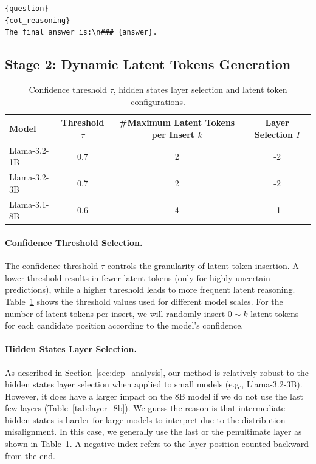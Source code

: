 \documentclass{article}
\theoremstyle{plain}
\theoremstyle{definition}
\theoremstyle{remark}
\begin{document}
\begin{tcolorbox}[colback=gray!5, colframe=gray!50, title=Stage 1 Prompt Template, width=0.7\textwidth, center]
\texttt{\{question\}}\\
\texttt{\{cot\_reasoning\}}\\
\texttt{The final answer is:\textbackslash n\#\#\# \{answer\}.}
\end{tcolorbox}

\subsection{Stage 2: Dynamic Latent Tokens Generation}
\label{app:stage2}
\begin{table}[h]
\centering
\begin{tabular}{lccc}
\toprule
\textbf{Model} & \textbf{Threshold $\tau$} & \textbf{\#Maximum Latent Tokens per Insert} $k$ & \textbf{Layer Selection $I$} \\
\midrule
Llama-3.2-1B & 0.7 & 2 & -2 \\
Llama-3.2-3B & 0.7 & 2 & -2 \\
Llama-3.1-8B & 0.6 & 4 & -1 \\
\bottomrule
\end{tabular}
\caption{Confidence threshold $\tau$, hidden states layer selection and latent token configurations.}
\label{tab:threshold_config}
\end{table}

\paragraph{Confidence Threshold Selection.}
The confidence threshold $\tau$ controls the granularity of latent token insertion. A lower threshold results in fewer latent tokens (only for highly uncertain predictions), while a higher threshold leads to more frequent latent reasoning. Table~\ref{tab:threshold_config} shows the threshold values used for different model scales. For the number of latent tokens per insert, we will randomly insert $0\sim k$ latent tokens for each candidate position according to the model’s confidence.


\paragraph{Hidden States Layer Selection.} 
As described in Section~\ref{sec:dep_analysis}, our method is relatively robust to the hidden states layer selection when applied to small models (e.g., Llama-3.2-3B). However, it does have a larger impact on the 8B model if we do not use the last few layers (Table~\ref{tab:layer_8b}). We guess the reason is that intermediate hidden states is harder for large models to interpret due to the distribution misalignment. In this case, we generally use the last or the penultimate layer as shown in Table~\ref{tab:threshold_config}. A negative index refers to the layer position counted backward from the end.
\end{document}
